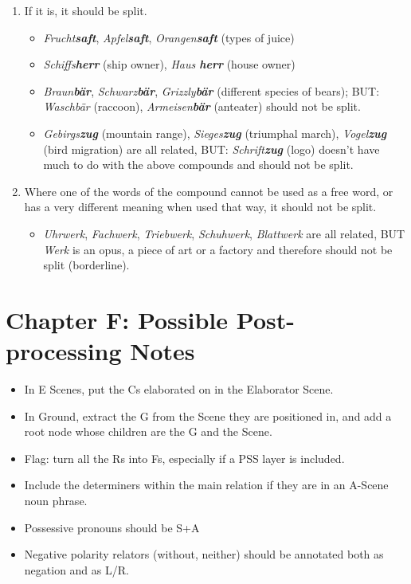 \documentclass[11pt]{article}
\begin{document}
\begin{enumerate}
\item
If it is, it should be split.
\begin{itemize}
\item
{\it Frucht{\bf saft}}, {\it Apfel{\bf saft}}, {\it Orangen{\bf saft}} (types of juice)
\item
{\it Schiffs{\bf herr}} (ship owner), {\it Haus {\bf herr}} (house owner)
\item
{\it Braun{\bf b\"{a}r}}, {\it Schwarz{\bf b\"ar}}, {\it Grizzly{\bf b\"ar}} (different species of bears);
BUT: {\it Waschb\"{a}r} (raccoon), {\it Armeisen{\bf b\"{a}r}} (anteater) should not be split.
\item
{\it Gebirgs{\bf zug}} (mountain range), {\it Sieges{\bf zug}} (triumphal march), {\it Vogel{\bf zug}} (bird migration) are all related,
BUT: {\it Schrift{\bf zug}} (logo) doesn't have much to do with the above compounds and should not be split.
\end{itemize}
\item
Where one of the words of the compound cannot be used as a free word, or has a very different meaning when used that way, it should not be split.
\begin{itemize}
\item
{\it Uhrwerk}, {\it Fachwerk}, {\it Triebwerk}, {\it Schuhwerk}, {\it Blattwerk} are all related, BUT {\it Werk} is an opus, a piece of art or a factory and therefore should not be split (borderline).
\end{itemize}
\end{enumerate}


\section{Chapter F: Possible Post-processing Notes}

\begin{itemize}
\item
  In E Scenes, put the Cs elaborated on in the Elaborator Scene.
\item
  In Ground, extract the G from the Scene they are positioned in, and add a root node whose children are the G and
  the Scene.
\item
 Flag: turn all the Rs into Fs, especially if a PSS layer is included.
\item
  Include the determiners within the main relation if they are in an A-Scene noun phrase.
\item
  Possessive pronouns should be S+A
\item
  Negative polarity relators (without, neither) should be annotated both as negation and as L/R.
\end{itemize}
\end{document}
